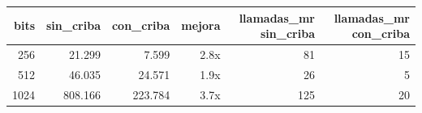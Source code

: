 \begin{tabular}{rrrrrr}
\toprule
bits & sin\_criba & con\_criba & mejora & llamadas\_mr sin\_criba & llamadas\_mr con\_criba \\
\midrule
256 & 21.299 & 7.599 & 2.8x & 81 & 15 \\
512 & 46.035 & 24.571 & 1.9x & 26 & 5 \\
1024 & 808.166 & 223.784 & 3.7x & 125 & 20 \\
\bottomrule
\end{tabular}

